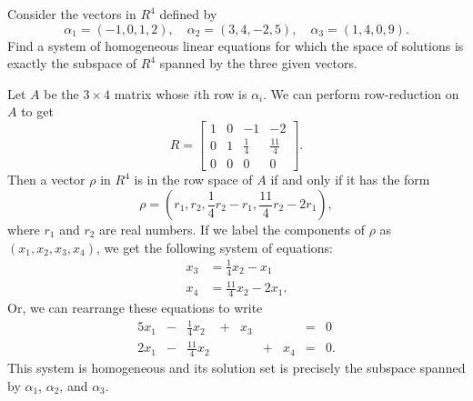  Consider the vectors in $R^4$ defined by
\begin{equation*}
  \alpha_1 = (-1, 0, 1, 2), \quad
  \alpha_2 = (3, 4, -2, 5), \quad
  \alpha_3 = (1, 4, 0, 9).
\end{equation*}
Find a system of homogeneous linear equations for which the space of
solutions is exactly the subspace of $R^4$ spanned by the three given
vectors.
\begin{solution}
  Let $A$ be the $3\times4$ matrix whose $i$th row is $\alpha_i$. We
  can perform row-reduction on $A$ to get
  \begin{equation*}
    R =
    \begin{bmatrix}
      1 & 0 & -1 & -2 \\[3pt]
      0 & 1 & \frac14 & \frac{11}4 \\[3pt]
      0 & 0 & 0 & 0
    \end{bmatrix}.
  \end{equation*}
  Then a vector $\rho$ in $R^4$ is in the row space of $A$ if and only
  if it has the form
  \begin{equation*}
    \rho = \left(r_1, r_2, \frac14r_2 - r_1, \frac{11}4r_2 - 2r_1\right),
  \end{equation*}
  where $r_1$ and $r_2$ are real numbers. If we label the components
  of $\rho$ as $(x_1,x_2,x_3,x_4)$, we get the following system of
  equations:
  \begin{align*}
    x_3 &= \frac14x_2 - x_1 \\
    x_4 &= \frac{11}4x_2 - 2x_1.
  \end{align*}
  Or, we can rearrange these equations to write
  \begin{alignat*}{5}
    x_1 &{}-{}& \frac14x_2 &{}+{}& x_3 && &{}={}& 0 \\
    2x_1 &{}-{}& \frac{11}4x_2 && &{}+{}& x_4 &{}={}& 0.
  \end{alignat*}
  This system is homogeneous and its solution set is precisely the
  subspace spanned by $\alpha_1$, $\alpha_2$, and $\alpha_3$.
\end{solution}
